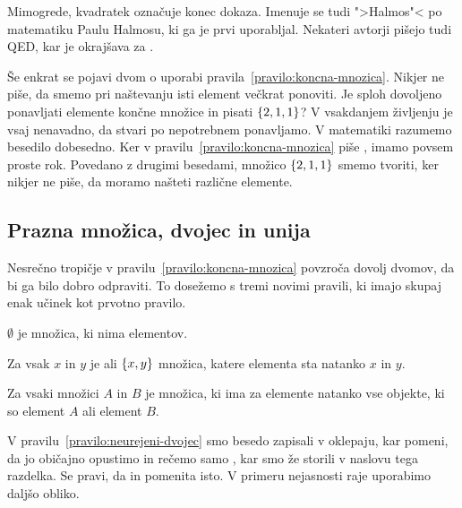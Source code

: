 Mimogrede, kvadratek označuje konec dokaza. Imenuje se tudi ">Halmos"< po matematiku
Paulu Halmosu, ki ga je prvi uporabljal. Nekateri avtorji pišejo tudi QED, kar je okrajšava za .

Še enkrat se pojavi dvom o uporabi pravila~\ref{pravilo:koncna-mnozica}. Nikjer ne piše, da smemo pri naštevanju isti element večkrat ponoviti. Je sploh dovoljeno ponavljati elemente končne množice in pisati $\left\{2, 1, 1\right\}$?
%
V vsakdanjem življenju je vsaj nenavadno, da stvari po nepotrebnem ponavljamo.
%
V matematiki razumemo besedilo dobesedno. Ker v pravilu~\ref{pravilo:koncna-mnozica} piše , imamo povsem proste rok. Povedano z drugimi besedami, množico
$\left\{2, 1, 1\right\}$ smemo tvoriti, ker nikjer ne piše, da moramo našteti različne elemente.

\subsection{Prazna množica, dvojec in unija}
\label{sec:prazna-dvojec-unija}

Nesrečno tropičje v pravilu~\ref{pravilo:koncna-mnozica} povzroča dovolj dvomov, da bi ga bilo dobro odpraviti.
To dosežemo s tremi novimi pravili, ki imajo skupaj enak učinek kot prvotno pravilo.

\begin{pravilo}
  \label{pravilo:prazna-mnozica}
   $\emptyset$ je množica, ki nima elementov.
\end{pravilo}

\begin{pravilo}
  \label{pravilo:neurejeni-dvojec}
  Za vsak $x$ in $y$ je  ali  $\left\{x, y\right\}$ množica, katere
  elementa sta natanko $x$ in $y$.
\end{pravilo}

\begin{pravilo}
  \label{pravilo:unija}
  Za vsaki množici $A$ in $B$ je  množica, ki ima za elemente
  natanko vse objekte, ki so element $A$ ali element $B$.
\end{pravilo}

V pravilu~\ref{pravilo:neurejeni-dvojec} smo besedo  zapisali v oklepaju, kar
pomeni, da jo običajno opustimo in rečemo samo , kar smo že storili v naslovu tega razdelka. Se pravi, da  in  pomenita isto. V primeru nejasnosti raje uporabimo daljšo obliko.

